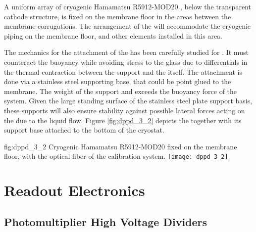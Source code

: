 
A uniform array of \dpnumpmtch cryogenic Hamamatsu R5912-MOD20 , below the transparent cathode structure, is fixed on the membrane floor in the areas between the membrane corrugations. The arrangement of the  
will accommodate the cryogenic piping on the membrane floor, %
and other elements %
installed in this area. %

The mechanics for the attachment of the  has been carefully studied for . It must counteract the  buoyancy while avoiding stress to the  glass due to differentials in the thermal contraction between the support and the  itself. The %
attachment is done via a stainless steel supporting base, that could be point glued to the membrane. The weight of the support and  exceeds the buoyancy force of the system. Given the large standing surface of the stainless steel plate support basis, these supports will also ensure stability against possible lateral forces acting on the  due to the liquid flow. Figure \ref{fig:dppd_3_2} depicts the  together with its support base attached to the bottom of the cryostat.

\begin{dunefigure}{fig:dppd_3_2}
{Cryogenic Hamamatsu R5912-MOD20  fixed on the membrane floor, with the optical fiber of the calibration system.}
\texttt{[image: dppd\_3\_2]}
\end{dunefigure}

\section{Readout Electronics}
\label{sec:fddp-pd-4}

\subsection{Photomultiplier High Voltage Dividers}
\label{sec:fddp-pd-4.1}

